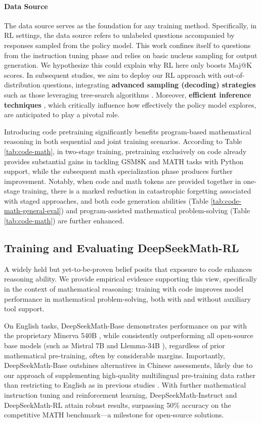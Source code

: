 \paragraph{Data Source} The data source serves as the foundation for any training method. Specifically, in RL settings, the data source refers to unlabeled questions accompanied by responses sampled from the policy model. This work confines itself to questions from the instruction tuning phase and relies on basic nucleus sampling for output generation. We hypothesize this could explain why RL here only boosts Maj@K scores. In subsequent studies, we aim to deploy our RL approach with out-of-distribution questions, integrating \textbf{advanced sampling (decoding) strategies} such as those leveraging tree-search algorithms \citep{yao2023tree}. Moreover, \textbf{efficient inference techniques} \citep{xia-etal-2023-speculative,leviathan2023fast,kwon2023efficient,xia2024unlocking}, which critically influence how effectively the policy model explores, are anticipated to play a pivotal role.

Introducing code pretraining significantly benefits program-based mathematical reasoning in both sequential and joint training scenarios. According to Table \ref{tab:code-math}, in two-stage training, pretraining exclusively on code already provides substantial gains in tackling GSM8K and MATH tasks with Python support, while the subsequent math specialization phase produces further improvement. Notably, when code and math tokens are provided together in one-stage training, there is a marked reduction in catastrophic forgetting associated with staged approaches, and both code generation abilities (Table \ref{tab:code-math-general-eval}) and program-assisted mathematical problem-solving (Table \ref{tab:code-math}) are further enhanced.

\subsection{Training and Evaluating DeepSeekMath-RL}

A widely held but yet-to-be-proven belief posits that exposure to code enhances reasoning ability. We provide empirical evidence supporting this view, specifically in the context of mathematical reasoning: training with code improves model performance in mathematical problem-solving, both with and without auxiliary tool support.

    On English tasks, DeepSeekMath-Base demonstrates performance on par with the proprietary Minerva 540B \citep{minerva}, while consistently outperforming all open-source base models (such as Mistral 7B \citep{mistral} and Llemma-34B \citep{llemma}), regardless of prior mathematical pre-training, often by considerable margins. Importantly, DeepSeekMath-Base outshines alternatives in Chinese assessments, likely due to our approach of supplementing high-quality multilingual pre-training data rather than restricting to English as in previous studies \citep{minerva,llemma}. With further mathematical instruction tuning and reinforcement learning, DeepSeekMath-Instruct and DeepSeekMath-RL attain robust results, surpassing 50\% accuracy on the competitive MATH benchmark—a milestone for open-source solutions.

